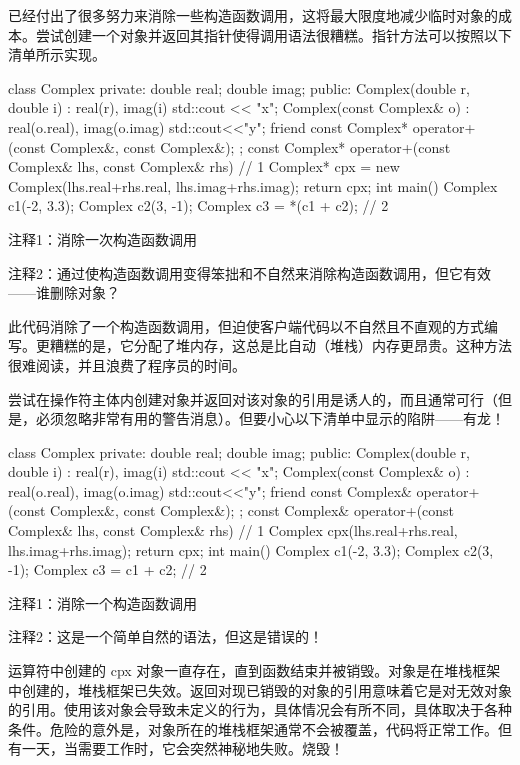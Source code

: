 
已经付出了很多努力来消除一些构造函数调用，这将最大限度地减少临时对象的成本。尝试创建一个对象并返回其指针使得调用语法很糟糕。指针方法可以按照以下清单所示实现。


\begin{cpp}
class Complex {
private:
  double real;
  double imag;
public:
  Complex(double r, double i) : real(r), imag(i) { std::cout << "x\n"; }
  Complex(const Complex& o) : real(o.real), imag(o.imag) {
    std::cout<<"y\n"; }
  friend const Complex* operator+(const Complex&, const Complex&);
};
const Complex* operator+(const Complex& lhs, const Complex& rhs) { // 1
  Complex* cpx = new Complex(lhs.real+rhs.real, lhs.imag+rhs.imag);
  return cpx;
}
int main() {
  Complex c1(-2, 3.3);
  Complex c2(3, -1);
  Complex c3 = *(c1 + c2); // 2
}
\end{cpp}

{\footnotesize
注释1：消除一次构造函数调用

注释2：通过使构造函数调用变得笨拙和不自然来消除构造函数调用，但它有效——谁删除对象？
}

此代码消除了一个构造函数调用，但迫使客户端代码以不自然且不直观的方式编写。更糟糕的是，它分配了堆内存，这总是比自动（堆栈）内存更昂贵。这种方法很难阅读，并且浪费了程序员的时间。

尝试在操作符主体内创建对象并返回对该对象的引用是诱人的，而且通常可行（但是，必须忽略非常有用的警告消息）。但要小心以下清单中显示的陷阱——有龙！


\begin{cpp}
class Complex {
private:
  double real;
  double imag;
public:
  Complex(double r, double i) : real(r), imag(i) { std::cout << "x\n"; }
  Complex(const Complex& o) : real(o.real), imag(o.imag) {
    std::cout<<"y\n"; }
  friend const Complex& operator+(const Complex&, const Complex&);
};
const Complex& operator+(const Complex& lhs, const Complex& rhs) { // 1
  Complex cpx(lhs.real+rhs.real, lhs.imag+rhs.imag);
  return cpx;
}
int main() {
  Complex c1(-2, 3.3);
  Complex c2(3, -1);
  Complex c3 = c1 + c2; // 2
}
\end{cpp}

{\footnotesize
注释1：消除一个构造函数调用

注释2：这是一个简单自然的语法，但这是错误的！
}

运算符中创建的 cpx 对象一直存在，直到函数结束并被销毁。对象是在堆栈框架中创建的，堆栈框架已失效。返回对现已销毁的对象的引用意味着它是对无效对象的引用。使用该对象会导致未定义的行为，具体情况会有所不同，具体取决于各种条件。危险的意外是，对象所在的堆栈框架通常不会被覆盖，代码将正常工作。但有一天，当需要工作时，它会突然神秘地失败。烧毁！

